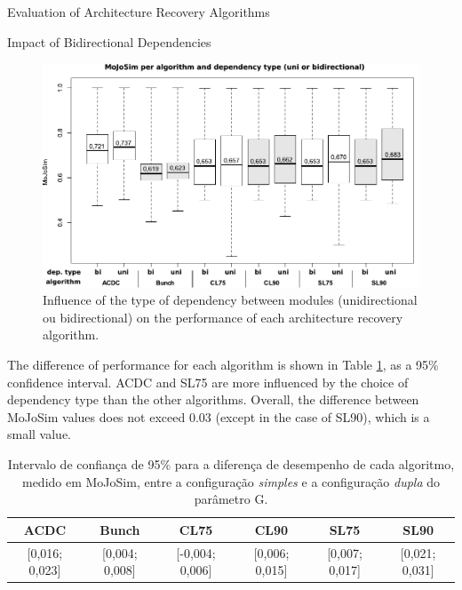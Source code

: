 \documentclass[11pt,twocolumn,a4paper,english]{article}
\begin{document}
\begin{section}{Evaluation of Architecture Recovery Algorithms}
\begin{subsection}{Impact of Bidirectional Dependencies}
	\begin{figure}[htbp]
		\centering
			\includegraphics[scale=1]{figures/exp-dependencies}
		\caption{Influence of the type of dependency between modules (unidirectional ou bidirectional) on the performance of each architecture recovery algorithm.}
		\label{fig:exp-dependencies}
	\end{figure}
	
	The difference of performance for each algorithm is shown in Table \ref{tab:exp-dependencies}, as a 95\% confidence interval. ACDC and SL75 are more influenced by the choice of dependency type than the other algorithms. Overall, the difference between MoJoSim values does not exceed 0.03 (except in the case of SL90), which is a small value.
	
	\begin{table}[width=\textwidth]
	  \begin{center}
	  \begin{tabular}{cccccc}
	    \hline
	    \textbf{ACDC} & \textbf{Bunch} & \textbf{CL75} & \textbf{CL90} & \textbf{SL75} & \textbf{SL90} \\
	    \hline
	    \hline
	    \footnotesize{[0,016; 0,023]} & \footnotesize{[0,004; 0,008]} & \footnotesize{[-0,004; 0,006]} & \footnotesize{[0,006; 0,015]} & \footnotesize{[0,007; 0,017]} & \footnotesize{[0,021; 0,031]} \\
	    \hline
	  \end{tabular}
	  \end{center}
	  \caption{Intervalo de confiança de 95\% para a diferença de desempenho de cada algoritmo, medido em MoJoSim, entre a configuração \emph{simples} e a configuração \emph{dupla} do parâmetro G.}
	  \label{tab:exp-dependencies}
	\end{table}
	

\end{subsection}
\end{section}
\end{document}
